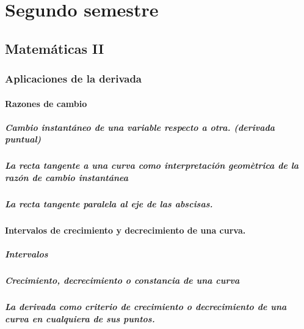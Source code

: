 \part{Segundo semestre}
\chapter{Matemáticas II}
\section{Aplicaciones de la derivada} %


\subsection{Razones de cambio} 
\subsubsection{Cambio instantáneo de  una variable respecto a otra. (derivada puntual)}
\subsubsection{La recta tangente a una curva  como interpretación geomètrica de la razón de cambio instantánea}
\subsubsection{La recta tangente paralela al eje de las abscisas.}





\subsection{Intervalos de crecimiento y decrecimiento de una curva.}
\subsubsection{Intervalos}
\subsubsection{Crecimiento, decrecimiento o constancia de una curva }
\subsubsection{La derivada como criterio de crecimiento o decrecimiento de una curva en cualquiera de sus puntos.}


